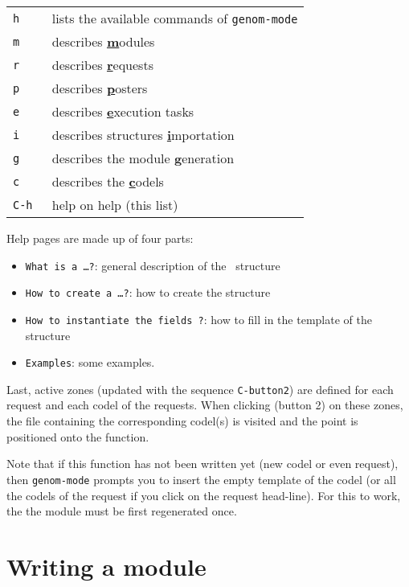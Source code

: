 {\small
\begin{tabular}{|l|p{10cm}|}
\hline
\tt h & lists the available commands of {\tt genom-mode}  \\
\tt m & describes \underline{\bf m}odules \\
\tt r & describes \underline{\bf r}equests \\
\tt p & describes \underline{\bf p}osters \\
\tt e & describes \underline{\bf e}xecution tasks \\
\tt i & describes structures \underline{\bf i}mportation \\
\tt g & describes the module \underline{\bf g}eneration  \\
\tt c & describes the \underline{\bf c}odels  \\
\tt C-h & help on help (this list) \\
\hline
\end{tabular}}

Help pages are made up of four parts:

\begin{itemize}
\item {\tt What is a \ldots ?}: general description of the \GenoM\
structure
\item {\tt How to create a \ldots ?}: how to create the structure
\item {\tt How to instantiate the fields ?}: how to fill in the template
of the structure
\item {\tt Examples}: some examples.
\end{itemize}

Last,  active   zones (updated  with   the sequence  {\tt C-button2}) are
defined for each request and each codel  of the requests. When clicking
(button 2) on these zones, the file containing the corresponding codel(s)
is visited  and the point is positioned  onto the function. 

Note that if this function has not been written yet (new codel or even
request), then {\tt genom-mode} prompts you to insert the empty template
of the codel (or all the codels of the request if you click on the request  
head-line). For this to work, the the module must be first regenerated once.

\section{Writing a module}

